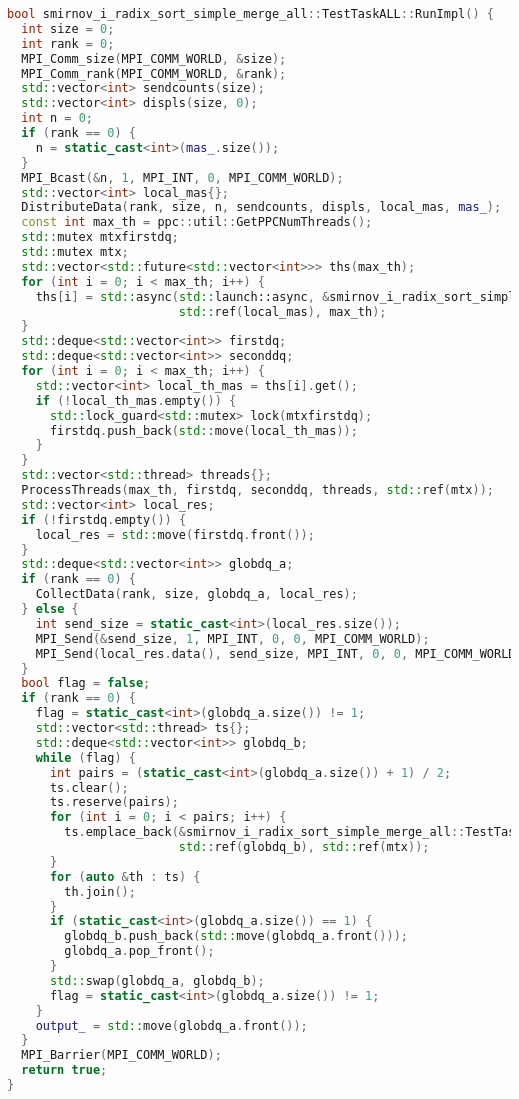 \documentclass[a4paper,12pt]{article}
\begin{document}
\begin{lstlisting}[language=C++,caption={Фрагмент MPI+STL версии}]
bool smirnov_i_radix_sort_simple_merge_all::TestTaskALL::RunImpl() {
  int size = 0;
  int rank = 0;
  MPI_Comm_size(MPI_COMM_WORLD, &size);
  MPI_Comm_rank(MPI_COMM_WORLD, &rank);
  std::vector<int> sendcounts(size);
  std::vector<int> displs(size, 0);
  int n = 0;
  if (rank == 0) {
    n = static_cast<int>(mas_.size());
  }
  MPI_Bcast(&n, 1, MPI_INT, 0, MPI_COMM_WORLD);
  std::vector<int> local_mas{};
  DistributeData(rank, size, n, sendcounts, displs, local_mas, mas_);
  const int max_th = ppc::util::GetPPCNumThreads();
  std::mutex mtxfirstdq;
  std::mutex mtx;
  std::vector<std::future<std::vector<int>>> ths(max_th);
  for (int i = 0; i < max_th; i++) {
    ths[i] = std::async(std::launch::async, &smirnov_i_radix_sort_simple_merge_all::TestTaskALL::Sorting, i,
                        std::ref(local_mas), max_th);
  }
  std::deque<std::vector<int>> firstdq;
  std::deque<std::vector<int>> seconddq;
  for (int i = 0; i < max_th; i++) {
    std::vector<int> local_th_mas = ths[i].get();
    if (!local_th_mas.empty()) {
      std::lock_guard<std::mutex> lock(mtxfirstdq);
      firstdq.push_back(std::move(local_th_mas));
    }
  }
  std::vector<std::thread> threads{};
  ProcessThreads(max_th, firstdq, seconddq, threads, std::ref(mtx));
  std::vector<int> local_res;
  if (!firstdq.empty()) {
    local_res = std::move(firstdq.front());
  }
  std::deque<std::vector<int>> globdq_a;
  if (rank == 0) {
    CollectData(rank, size, globdq_a, local_res);
  } else {
    int send_size = static_cast<int>(local_res.size());
    MPI_Send(&send_size, 1, MPI_INT, 0, 0, MPI_COMM_WORLD);
    MPI_Send(local_res.data(), send_size, MPI_INT, 0, 0, MPI_COMM_WORLD);
  }
  bool flag = false;
  if (rank == 0) {
    flag = static_cast<int>(globdq_a.size()) != 1;
    std::vector<std::thread> ts{};
    std::deque<std::vector<int>> globdq_b;
    while (flag) {
      int pairs = (static_cast<int>(globdq_a.size()) + 1) / 2;
      ts.clear();
      ts.reserve(pairs);
      for (int i = 0; i < pairs; i++) {
        ts.emplace_back(&smirnov_i_radix_sort_simple_merge_all::TestTaskALL::Merging, std::ref(globdq_a),
                        std::ref(globdq_b), std::ref(mtx));
      }
      for (auto &th : ts) {
        th.join();
      }
      if (static_cast<int>(globdq_a.size()) == 1) {
        globdq_b.push_back(std::move(globdq_a.front()));
        globdq_a.pop_front();
      }
      std::swap(globdq_a, globdq_b);
      flag = static_cast<int>(globdq_a.size()) != 1;
    }
    output_ = std::move(globdq_a.front());
  }
  MPI_Barrier(MPI_COMM_WORLD);
  return true;
}
\end{lstlisting}
\end{document}
